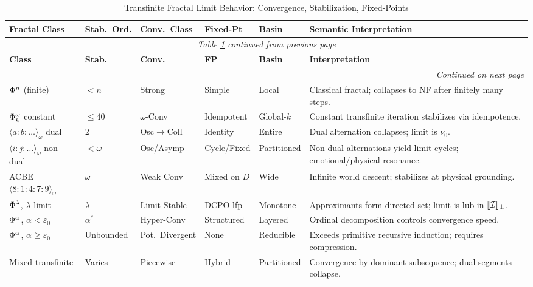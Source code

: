 \renewcommand{\arraystretch}{1.30}
\small
\begin{longtable}{p{2.2cm}|p{1.3cm}|p{1.5cm}|p{1.5cm}|p{1.3cm}|p{4cm}}
\caption{Transfinite Fractal Limit Behavior: Convergence, Stabilization, Fixed-Points}
\label{tab:transfinite-fractal-limits} \\
\toprule
\textbf{Fractal Class}
& \textbf{Stab.\ Ord.}
& \textbf{Conv.\ Class}
& \textbf{Fixed-Pt}
& \textbf{Basin}
& \textbf{Semantic Interpretation}
\\
\midrule
\endfirsthead
\multicolumn{6}{c}{\textit{Table \ref{tab:transfinite-fractal-limits} continued from previous page}} \\
\toprule
\textbf{Class}
& \textbf{Stab.}
& \textbf{Conv.}
& \textbf{FP}
& \textbf{Basin}
& \textbf{Interpretation}
\\
\midrule
\endhead
\midrule
\multicolumn{6}{r}{\textit{Continued on next page}} \\
\endfoot
\bottomrule
\endlastfoot

$\Phi^{n}$ (finite)
& $< n$
& Strong
& Simple
& Local
& Classical fractal; collapses to NF after finitely many steps.
\\
\midrule

$\Phi^{\omega}_k$ constant
& $\le 40$
& $\omega$-Conv
& Idempotent
& Global-$k$
& Constant transfinite iteration stabilizes via idempotence.
\\
\midrule

$\langle a:b:\dots \rangle_\omega$ dual
& $2$
& Osc$\to$Coll
& Identity
& Entire
& Dual alternation collapses; limit is $\nu_0$.
\\
\midrule

$\langle i:j:\dots \rangle_\omega$ non-dual
& $< \omega$
& Osc/Asymp
& Cycle/Fixed
& Partitioned
& Non-dual alternations yield limit cycles; emotional/physical resonance.
\\
\midrule

ACBE $\langle 8:1:4:7:9\rangle_\omega$
& $\omega$
& Weak Conv
& Mixed on $D$
& Wide
& Infinite world descent; stabilizes at physical grounding.
\\
\midrule

$\Phi^{\lambda}$, $\lambda$ limit
& $\lambda$
& Limit-Stable
& DCPO lfp
& Monotone
& Approximants form directed set; limit is lub in $\llbracket \mathcal{I} \rrbracket_\bot$.
\\
\midrule

$\Phi^{\alpha}$, $\alpha < \varepsilon_0$
& $\alpha^*$
& Hyper-Conv
& Structured
& Layered
& Ordinal decomposition controls convergence speed.
\\
\midrule

$\Phi^{\alpha}$, $\alpha \ge \varepsilon_0$
& Unbounded
& Pot.\ Divergent
& None
& Reducible
& Exceeds primitive recursive induction; requires compression.
\\
\midrule

Mixed transfinite
& Varies
& Piecewise
& Hybrid
& Partitioned
& Convergence by dominant subsequence; dual segments collapse.
\\

\end{longtable}
\normalsize

